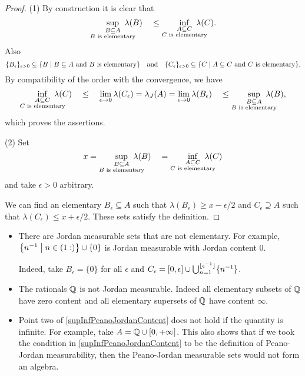 \begin{proof}
(1) By construction it is clear that
\[ \sup_{\substack{B\subseteq A \\ \text{$B$ is elementary}}} \hspace{-1.5em}\lambda(B) \quad \leq \inf_{\substack{A\subseteq C \\ \text{$C$ is elementary}}} \hspace{-1.5em}\lambda(C). \]
Also
\[ \{B_\epsilon\}_{\epsilon > 0} \subseteq \setbuilder{B}{\text{$B\subseteq A$ and $B$ is elementary}} \quad\text{and}\quad \{C_\epsilon\}_{\epsilon > 0} \subseteq \setbuilder{C}{\text{$A\subseteq C$ and $C$ is elementary}}. \]
By compatibility of the order with the convergence, we have
\[ \inf_{\substack{A\subseteq C \\ \text{$C$ is elementary}}} \hspace{-1.5em}\lambda(C) \quad \leq \quad \lim_{\epsilon\to 0}\lambda(C_\epsilon) = \lambda_J(A) = \lim_{\epsilon\to 0}\lambda(B_\epsilon) \quad \leq \sup_{\substack{B\subseteq A \\ \text{$B$ is elementary}}} \hspace{-1.5em}\lambda(B), \]
which proves the assertions.

(2) Set
\[ x = \sup_{\substack{B\subseteq A \\ \text{$B$ is elementary}}} \hspace{-1.5em}\lambda(B) \quad = \inf_{\substack{A\subseteq C \\ \text{$C$ is elementary}}} \hspace{-1.5em}\lambda(C) \]
and take $\epsilon >0$ arbitrary.

We can find an elementary $B_\epsilon \subseteq A$ such that $\lambda(B_\epsilon) \geq x-\epsilon/2$ and $C_\epsilon \supseteq A$ such that $\lambda(C_\epsilon) \leq x+\epsilon/2$. These sets satisfy the definition.
\end{proof}

\begin{example}
\begin{itemize}
\item There are Jordan measurable sets that are not elementary. For example, $\setbuilder{n^{-1}}{n\in (1:)} \cup \{0\}$ is Jordan measurable with Jordan content $0$.

Indeed, take $B_\epsilon = \{0\}$ for all $\epsilon$ and $C_\epsilon = \interval{0,\epsilon} \cup\bigcup_{n=1}^{\floor{\epsilon^{-1}}} \{n^{-1}\}$.
\item The rationals $\mathbb{Q}$ is not Jordan measurable. Indeed all elementary subsets of $\mathbb{Q}$ have zero content and all elementary supersets of $\mathbb{Q}$ have content $\infty$.
\item Point two of \ref{supInfPeanoJordanContent} does not hold if the quantity is infinite. For example, take $A = \Q \cup \interval{0,+\infty}$. This also shows that if we took the condition in \ref{supInfPeanoJordanContent} to be the definition of Peano-Jordan measurability, then the Peano-Jordan measurable sets would not form an algebra.
\end{itemize}
\end{example}

